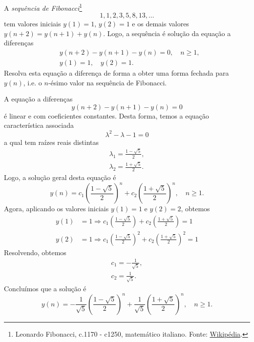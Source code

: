 \begin{exeresol}
  A \emph{sequência de Fibonacci}\footnote{Leonardo Fibonacci, c.1170 - c1250, matemático italiano. Fonte: \href{https://pt.wikipedia.org/wiki/Leonardo_Fibonacci}{Wikipédia}.}
  \begin{equation}
    1, 1, 2, 3, 5, 8, 13, \ldots
  \end{equation}
  tem valores iniciais $y(1)=1$, $y(2)=1$ e os demais valores $y(n+2)=y(n+1)+y(n)$. Logo, a sequência é solução da equação a diferenças
  \begin{align}
    &y(n+2)-y(n+1)-y(n)=0,\quad n\geq 1,\\
    &y(1)=1,\quad y(2)=1.
  \end{align}
  Resolva esta equação a diferença de forma a obter uma forma fechada para $y(n)$, i.e. o $n$-ésimo valor na sequência de Fibonacci.
\end{exeresol}
\begin{resol}
  A equação a diferenças
  \begin{equation}
    y(n+2)-y(n+1)-y(n)=0
  \end{equation}
  é linear e com coeficientes constantes. Desta forma, temos a equação característica associada
  \begin{equation}
    \lambda^2 - \lambda -1 = 0
  \end{equation}
  a qual tem raízes reais distintas
  \begin{align*}
    \lambda_1 = \frac{1-\sqrt{5}}{2},\\
    \lambda_2 = \frac{1+\sqrt{5}}{2}.
  \end{align*}
  Logo, a solução geral desta equação é
  \begin{equation}
    y(n) = c_1\left(\frac{1-\sqrt{5}}{2}\right)^n + c_2\left(\frac{1+\sqrt{5}}{2}\right)^n,\quad n\geq 1.
  \end{equation}
  Agora, aplicando os valores iniciais $y(1)=1$ e $y(2)=2$, obtemos
  \begin{align*}
    y(1)&=1\Rightarrow c_1\left(\frac{1-\sqrt{5}}{2}\right) + c_2\left(\frac{1+\sqrt{5}}{2}\right) = 1\\
    y(2)&=1\Rightarrow c_1\left(\frac{1-\sqrt{5}}{2}\right)^2 + c_2\left(\frac{1+\sqrt{5}}{2}\right)^2 = 1
  \end{align*}
  Resolvendo, obtemos
  \begin{gather}
    c_1 = -\frac{1}{\sqrt{5}},\\
    c_2 = \frac{1}{\sqrt{5}}.
  \end{gather}
  Concluímos que a solução é
  \begin{equation}
    y(n) = -\frac{1}{\sqrt{5}}\left(\frac{1-\sqrt{5}}{2}\right)^n + \frac{1}{\sqrt{5}}\left(\frac{1+\sqrt{5}}{2}\right)^n,\quad n\geq 1.
  \end{equation}
\end{resol}

